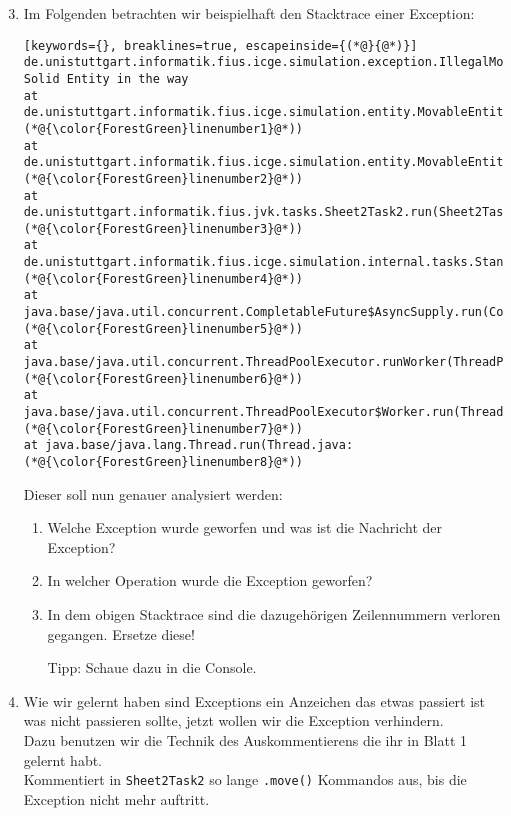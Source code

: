 \begin{enumerate}[label=\alph*)] \setcounter{enumi}{2}
    \item Im Folgenden betrachten wir beispielhaft den Stacktrace einer Exception:
        \begin{lstlisting}[keywords={}, breaklines=true, escapeinside={(*@}{@*)}]
de.unistuttgart.informatik.fius.icge.simulation.exception.IllegalMoveException: Solid Entity in the way
at de.unistuttgart.informatik.fius.icge.simulation.entity.MovableEntity.internalMove(MovableEntity.java:(*@{\color{ForestGreen}linenumber1}@*))
at de.unistuttgart.informatik.fius.icge.simulation.entity.MovableEntity.move(MovableEntity.java:(*@{\color{ForestGreen}linenumber2}@*))
at de.unistuttgart.informatik.fius.jvk.tasks.Sheet2Task2.run(Sheet2Task2.java:(*@{\color{ForestGreen}linenumber3}@*))
at de.unistuttgart.informatik.fius.icge.simulation.internal.tasks.StandardTaskRunner.executeTask(StandardTaskRunner.java:(*@{\color{ForestGreen}linenumber4}@*))
at java.base/java.util.concurrent.CompletableFuture$AsyncSupply.run(CompletableFuture.java:(*@{\color{ForestGreen}linenumber5}@*))
at java.base/java.util.concurrent.ThreadPoolExecutor.runWorker(ThreadPoolExecutor.java:(*@{\color{ForestGreen}linenumber6}@*))
at java.base/java.util.concurrent.ThreadPoolExecutor$Worker.run(ThreadPoolExecutor.java:(*@{\color{ForestGreen}linenumber7}@*))
at java.base/java.lang.Thread.run(Thread.java:(*@{\color{ForestGreen}linenumber8}@*))
        \end{lstlisting}

        Dieser soll nun genauer analysiert werden:

        \begin{enumerate}
            \item[i)] Welche Exception wurde geworfen und was ist die Nachricht der Exception?
            \item[ii)] In welcher Operation wurde die Exception geworfen?
            \item[iii)] In dem obigen Stacktrace sind die dazugehörigen Zeilennummern verloren gegangen. Ersetze diese!

                Tipp: Schaue dazu in die Console.
        \end{enumerate}

    \item Wie wir gelernt haben sind Exceptions ein Anzeichen das etwas passiert ist was nicht passieren sollte, jetzt wollen wir die Exception verhindern.\\
        Dazu benutzen wir die Technik des Auskommentierens die ihr in Blatt 1 gelernt habt.\\
        Kommentiert in \lstinline{Sheet2Task2} so lange \lstinline{.move()} Kommandos aus, bis die Exception nicht mehr auftritt.


\end{enumerate}
